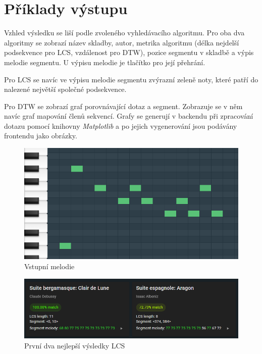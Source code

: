 \section{Příklady výstupu}

Vzhled výsledku se liší podle zvoleného vyhledávacího algoritmu. Pro oba dva algoritmy se zobrazí název skladby, autor, metrika algoritmu (délka nejdelší podsekvence pro LCS, vzdálenost pro DTW), pozice segmentu v skladbě a výpis melodie segmentu. U výpisu melodie je tlačítko pro její přehrání.

Pro LCS se navíc ve výpisu melodie segmentu zvýrazní zeleně noty, které patří do nalezené největší společné podsekvence.

Pro DTW se zobrazí graf porovnávající dotaz a segment. Zobrazuje se v něm navíc graf mapování členů sekvencí. Grafy se generují v backendu při zpracování dotazu pomocí knihovny \textit{Matplotlib} a po jejich vygenerování jsou podávány frontendu jako obrázky.

\begin{figure}[!ht]
    \centering
    \caption{Vstupní melodie}
    \includegraphics[width=\textwidth]{images/input_melody.png}
\end{figure}

\begin{figure}[!ht]
    \centering
    \caption{První dva nejlepší výsledky LCS}
    \includegraphics[width=\textwidth]{images/lcs_results.png}
\end{figure}

